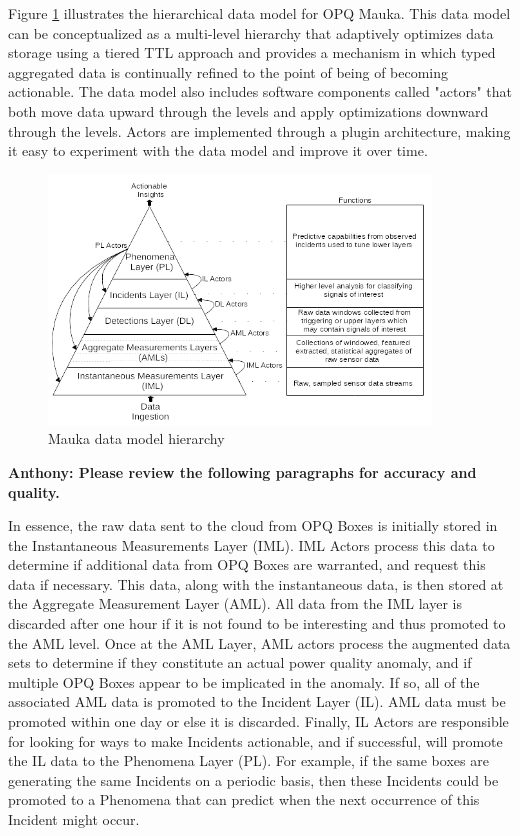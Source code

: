 Figure \ref{fig:mauka-data-model} illustrates the hierarchical data model for OPQ Mauka. This data model can be conceptualized as a multi-level hierarchy that adaptively optimizes data storage using a tiered TTL approach and provides a mechanism in which typed aggregated data is continually refined to the point of being of becoming actionable. The data model also includes software components called "actors" that both move data upward through the levels and apply optimizations downward through the levels. Actors are implemented through a plugin architecture, making it easy to experiment with the data model and improve it over time.

\begin{figure}
\center \includegraphics[width=4in]{images/mauka/mauka-data-model.png}
\caption{Mauka data model hierarchy}
\label{fig:mauka-data-model}
\end{figure}

{\bf Anthony: Please review the following paragraphs for accuracy and quality.}

In essence, the raw data sent to the cloud from OPQ Boxes is initially stored in the Instantaneous Measurements Layer (IML). IML Actors process this data to determine if additional data from OPQ Boxes are warranted, and request this data if necessary. This data, along with the instantaneous data, is then stored at the Aggregate Measurement Layer (AML).  All data from the IML layer is discarded after one hour if it is not found to be interesting and thus promoted to the AML level. Once at the AML Layer, AML actors process the augmented data sets to determine if they constitute an actual power quality anomaly, and if multiple OPQ Boxes appear to be implicated in the anomaly. If so, all of the associated AML data is promoted to the Incident Layer (IL).  AML data must be promoted within one day or else it is discarded.  Finally, IL Actors are responsible for looking for ways to make Incidents actionable, and if successful, will promote the IL data to the Phenomena Layer (PL). For example, if the same boxes are generating the same Incidents on a periodic basis, then these Incidents could be promoted to a Phenomena that can predict when the next occurrence of this Incident might occur.

